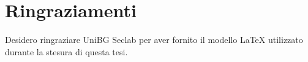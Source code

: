 \chapter*{Ringraziamenti}

Desidero ringraziare UniBG Seclab per aver fornito il modello LaTeX \cite{thesis-template} utilizzato durante la stesura di questa tesi.